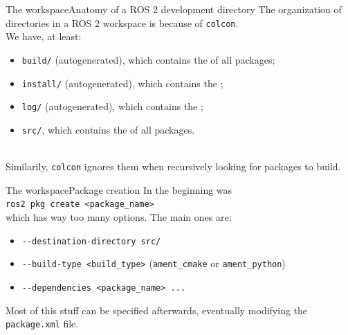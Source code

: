 \begin{frame}{The workspace}{Anatomy of a ROS 2 development directory}
  The organization of directories in a ROS 2 workspace is  because of \texttt{colcon}.\\
  We have, at least:
  \begin{itemize}
    \item \texttt{build/} (autogenerated), which contains the  of all packages;
    \item \texttt{install/} (autogenerated), which contains the ;
    \item \texttt{log/} (autogenerated), which contains the ;
    \item \texttt{src/}, which contains the  of all packages.
  \end{itemize}
  \begin{alertblock}{}
    \centering
    \\
    Similarily, \texttt{colcon} ignores them when recursively looking for packages to build.
  \end{alertblock}
\end{frame}
\begin{frame}{The workspace}{Package creation}
  In the beginning was\\
  \bigskip
  \texttt{ros2 pkg create <package\_name>}\\
  \bigskip
  which has way too many options. The main ones are:
  \begin{itemize}
    \item \texttt{-{}-destination-directory src/}
    \item \texttt{-{}-build-type <build\_type>} (\texttt{ament\_cmake} or \texttt{ament\_python})
    \item \texttt{-{}-dependencies <package\_name> ...}
  \end{itemize}
  Most of this stuff can be specified afterwards, eventually modifying the \texttt{package.xml} file.
\end{frame}
